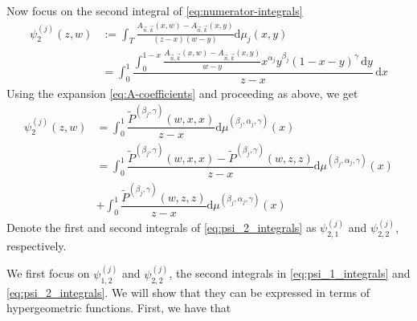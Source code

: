 \documentclass[11pt,reqno]{amsart}
\newcommand{\dr}{\mathrm{d}}
\theoremstyle{definition}
\begin{document}
Now focus on the second integral of \eqref{eq:numerator-integrals}
\begin{equation*}
    \begin{aligned}
    \psi^{(j)}_{2}(z,w)&:=\int_{T} \frac{A_{\vec n,\vec k}(x,w)-A_{\vec n,\vec k}(x,y)}{(z-x)(w-y)} \mathrm{d} \mu_j (x,y)\\
    &=  \int_{0}^{1}\dfrac{\int_{0}^{1-x} \frac{A_{\vec n,\vec k}(x,w)-A_{\vec n,\vec k}(x,y)}{w-y} x^{\alpha_j}y^{\beta_j} (1-x-y)^\gamma \,\dr y }{z-x}\, \dr x
    \end{aligned}
\end{equation*}
Using the expansion \eqref{eq:A-coefficients} and proceeding as above, we get
\begin{equation}
    \label{eq:psi_2_integrals}
    \begin{aligned}
    \psi^{(j)}_2(z,w)&=\int_0^1 \dfrac{\tilde P^{(\beta_j,\gamma)}(w,x,x)}{z-x}\dr \mu^{(\beta_j,\alpha_j,\gamma)}(x)\\
    & = \int_0^1 \dfrac{\tilde P^{(\beta_j,\gamma)}(w,x,x)-\tilde P^{(\beta_j,\gamma)}(w,z,z)}{z-x}\dr \mu^{(\beta_j,\alpha_j,\gamma)}(x)\\ &+\int_0^1 \dfrac{\tilde P^{(\beta_j,\gamma)}(w,z,z)}{z-x}\dr \mu^{(\beta_j,\alpha_j,\gamma)}(x)
    \end{aligned}
\end{equation}
Denote the first and second integrals of \eqref{eq:psi_2_integrals} as $\psi_{2,1}^{(j)}$ and $\psi_{2,2}^{(j)}$, respectively.

We first focus on $\psi_{1,2}^{(j)}$ and $\psi_{2,2}^{(j)}$, the second integrals in \eqref{eq:psi_1_integrals} and \eqref{eq:psi_2_integrals}. We will show that they can be expressed in terms of hypergeometric functions. First, we have that
\end{document}
